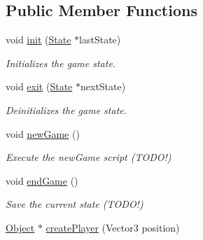 \subsection*{\-Public \-Member \-Functions}
\begin{DoxyCompactItemize}
\item 
\hypertarget{classGame_a35a293ebe46eaf5e3a866e8ac16c99a8}{
void \hyperlink{classGame_a35a293ebe46eaf5e3a866e8ac16c99a8}{init} (\hyperlink{classState}{\-State} $\ast$last\-State)}
\label{d9/d68/classGame_a35a293ebe46eaf5e3a866e8ac16c99a8}

\begin{DoxyCompactList}\small\item\em \-Initializes the game state. \end{DoxyCompactList}\item 
\hypertarget{classGame_ae6133d7d921701bb15f71247910f2591}{
void \hyperlink{classGame_ae6133d7d921701bb15f71247910f2591}{exit} (\hyperlink{classState}{\-State} $\ast$next\-State)}
\label{d9/d68/classGame_ae6133d7d921701bb15f71247910f2591}

\begin{DoxyCompactList}\small\item\em \-Deinitializes the game state. \end{DoxyCompactList}\item 
\hypertarget{classGame_a12f32ba70a35a0dcd1f527b4d4a0d2c4}{
void \hyperlink{classGame_a12f32ba70a35a0dcd1f527b4d4a0d2c4}{new\-Game} ()}
\label{d9/d68/classGame_a12f32ba70a35a0dcd1f527b4d4a0d2c4}

\begin{DoxyCompactList}\small\item\em \-Execute the new\-Game script (\-T\-O\-D\-O!) \end{DoxyCompactList}\item 
\hypertarget{classGame_a7d88788cf4b0da39a0245d418aa6f37a}{
void \hyperlink{classGame_a7d88788cf4b0da39a0245d418aa6f37a}{end\-Game} ()}
\label{d9/d68/classGame_a7d88788cf4b0da39a0245d418aa6f37a}

\begin{DoxyCompactList}\small\item\em \-Save the current state (\-T\-O\-D\-O!) \end{DoxyCompactList}\item 
\hypertarget{classGame_a457ae6aeac81a95710f9a130201bbdda}{
\hyperlink{classObject}{\-Object} $\ast$ \hyperlink{classGame_a457ae6aeac81a95710f9a130201bbdda}{create\-Player} (\-Vector3 position)}
\label{d9/d68/classGame_a457ae6aeac81a95710f9a130201bbdda}


\end{DoxyCompactItemize}
